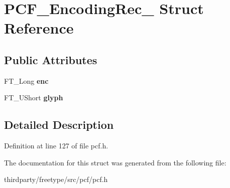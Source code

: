 \hypertarget{struct_p_c_f___encoding_rec__}{}\section{P\+C\+F\+\_\+\+Encoding\+Rec\+\_\+ Struct Reference}
\label{struct_p_c_f___encoding_rec__}
\subsection*{Public Attributes}
\begin{DoxyCompactItemize}
\item 
\mbox{\label{struct_p_c_f___encoding_rec___a4f4e6dc5a2e740272e27b56be171a312}} 
F\+T\+\_\+\+Long {\bfseries enc}
\item 
\mbox{\label{struct_p_c_f___encoding_rec___ad12019ac053d2a3d855a414116553cbe}} 
F\+T\+\_\+\+U\+Short {\bfseries glyph}
\end{DoxyCompactItemize}


\subsection{Detailed Description}


Definition at line 127 of file pcf.\+h.



The documentation for this struct was generated from the following file\+:\begin{DoxyCompactItemize}
\item 
thirdparty/freetype/src/pcf/pcf.\+h\end{DoxyCompactItemize}
